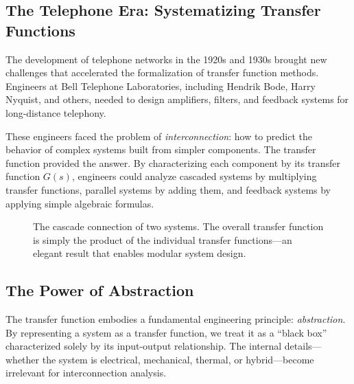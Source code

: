 \subsection{The Telephone Era: Systematizing Transfer Functions}

The development of telephone networks in the 1920s and 1930s brought new challenges that accelerated the formalization of transfer function methods. Engineers at Bell Telephone Laboratories, including Hendrik Bode, Harry Nyquist, and others, needed to design amplifiers, filters, and feedback systems for long-distance telephony.

These engineers faced the problem of \textit{interconnection}: how to predict the behavior of complex systems built from simpler components. The transfer function provided the answer. By characterizing each component by its transfer function $G(s)$, engineers could analyze cascaded systems by multiplying transfer functions, parallel systems by adding them, and feedback systems by applying simple algebraic formulas.

\begin{figure}[h]
\centering
{}
\caption{The cascade connection of two systems. The overall transfer function is simply the product of the individual transfer functions---an elegant result that enables modular system design.}
\label{fig:cascade_simple}
\end{figure}

\subsection{The Power of Abstraction}

The transfer function embodies a fundamental engineering principle: \textit{abstraction}. By representing a system as a transfer function, we treat it as a ``black box'' characterized solely by its input-output relationship. The internal details---whether the system is electrical, mechanical, thermal, or hybrid---become irrelevant for interconnection analysis.

